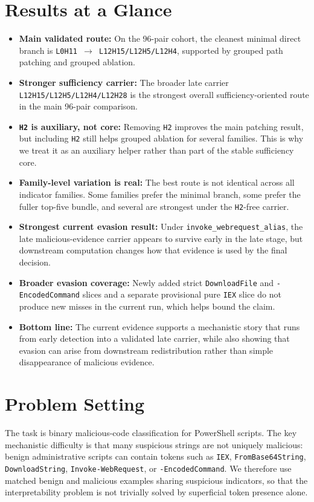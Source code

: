 \documentclass{article}
\begin{document}
\section{Results at a Glance}
\begin{itemize}[leftmargin=1.5em]
  \item \textbf{Main validated route:} On the 96-pair cohort, the cleanest minimal direct branch is \texttt{L0H11 $\rightarrow$ L12H15/L12H5/L12H4}, supported by grouped path patching and grouped ablation.
  \item \textbf{Stronger sufficiency carrier:} The broader late carrier \texttt{L12H15/L12H5/L12H4/L12H28} is the strongest overall sufficiency-oriented route in the main 96-pair comparison.
  \item \textbf{\texttt{H2} is auxiliary, not core:} Removing \texttt{H2} improves the main patching result, but including \texttt{H2} still helps grouped ablation for several families. This is why we treat it as an auxiliary helper rather than part of the stable sufficiency core.
  \item \textbf{Family-level variation is real:} The best route is not identical across all indicator families. Some families prefer the minimal branch, some prefer the fuller top-five bundle, and several are strongest under the \texttt{H2}-free carrier.
  \item \textbf{Strongest current evasion result:} Under \texttt{invoke\_webrequest\_alias}, the late malicious-evidence carrier appears to survive early in the late stage, but downstream computation changes how that evidence is used by the final decision.
  \item \textbf{Broader evasion coverage:} Newly added strict \texttt{DownloadFile} and \texttt{-EncodedCommand} slices and a separate provisional pure \texttt{IEX} slice do not produce new misses in the current run, which helps bound the claim.
  \item \textbf{Bottom line:} The current evidence supports a mechanistic story that runs from early detection into a validated late carrier, while also showing that evasion can arise from downstream redistribution rather than simple disappearance of malicious evidence.
\end{itemize}

\section{Problem Setting}
The task is binary malicious-code classification for PowerShell scripts. The key mechanistic difficulty is that many suspicious strings are not uniquely malicious: benign administrative scripts can contain tokens such as \texttt{IEX}, \texttt{FromBase64String}, \texttt{DownloadString}, \texttt{Invoke-WebRequest}, or \texttt{-EncodedCommand}. We therefore use matched benign and malicious examples sharing suspicious indicators, so that the interpretability problem is not trivially solved by superficial token presence alone.
\end{document}
